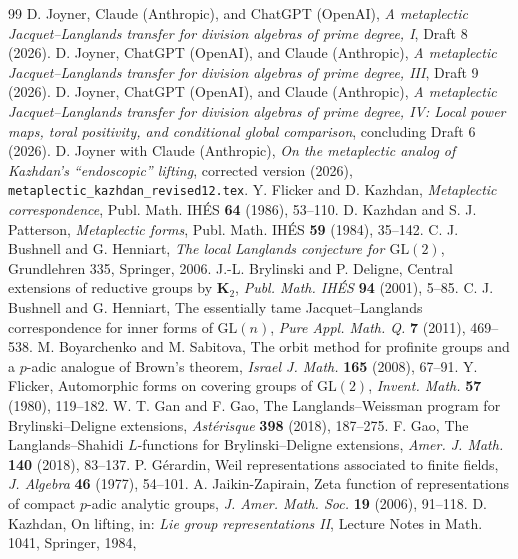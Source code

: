\documentclass[11pt]{article}
\theoremstyle{plain}
\theoremstyle{definition}
\begin{document}
\begin{thebibliography}{99}
 D. Joyner, Claude (Anthropic), and ChatGPT (OpenAI),
\emph{A metaplectic Jacquet--Langlands transfer for division
algebras of prime degree, I}, Draft 8 (2026).
 D. Joyner, ChatGPT (OpenAI), and Claude (Anthropic),
\emph{A metaplectic Jacquet--Langlands transfer for division
algebras of prime degree, III}, Draft 9 (2026).
 D. Joyner, ChatGPT (OpenAI), and Claude (Anthropic),
\emph{A metaplectic Jacquet--Langlands transfer for division
algebras of prime degree, IV: Local power maps, toral positivity,
and conditional global comparison}, concluding Draft 6 (2026).
 D. Joyner with Claude (Anthropic),
\emph{On the metaplectic analog of Kazhdan's ``endoscopic'' lifting},
corrected version (2026), \texttt{metaplectic\_kazhdan\_revised12.tex}.
 Y. Flicker and D. Kazhdan,
\emph{Metaplectic correspondence}, Publ. Math. IH\'ES
\textbf{64} (1986), 53--110.
 D. Kazhdan and S. J. Patterson, \emph{Metaplectic forms},
Publ. Math. IH\'ES \textbf{59} (1984), 35--142.
 C. J. Bushnell and G. Henniart, \emph{The local Langlands
conjecture for $\mathrm{GL}(2)$}, Grundlehren 335, Springer, 2006.
 J.-L. Brylinski and P. Deligne, Central extensions of
reductive groups by $\mathbf K_2$, \emph{Publ. Math. IH\'ES} \textbf{94}
(2001), 5--85.
 C. J. Bushnell and G. Henniart, The essentially tame
Jacquet--Langlands correspondence for inner forms of $\mathrm{GL}(n)$,
\emph{Pure Appl. Math. Q.} \textbf{7} (2011), 469--538.
 M. Boyarchenko and M. Sabitova, The orbit method for
profinite groups and a $p$-adic analogue of Brown's theorem, \emph{Israel
J. Math.} \textbf{165} (2008), 67--91.
 Y. Flicker, Automorphic forms on covering groups of
$\mathrm{GL}(2)$, \emph{Invent. Math.} \textbf{57} (1980), 119--182.
 W. T. Gan and F. Gao, The Langlands--Weissman program for
Brylinski--Deligne extensions, \emph{Ast\'erisque} \textbf{398} (2018),
187--275.
 F. Gao, The Langlands--Shahidi $L$-functions for
Brylinski--Deligne extensions, \emph{Amer. J. Math.} \textbf{140} (2018),
83--137.
 P. G\'erardin, Weil representations associated to finite
fields, \emph{J. Algebra} \textbf{46} (1977), 54--101.
 A. Jaikin-Zapirain, Zeta function of representations of
compact $p$-adic analytic groups, \emph{J. Amer. Math. Soc.} \textbf{19}
(2006), 91--118.
 D. Kazhdan, On lifting, in: \emph{Lie group
representations II}, Lecture Notes in Math. 1041, Springer, 1984,

\end{thebibliography}
\end{document}
